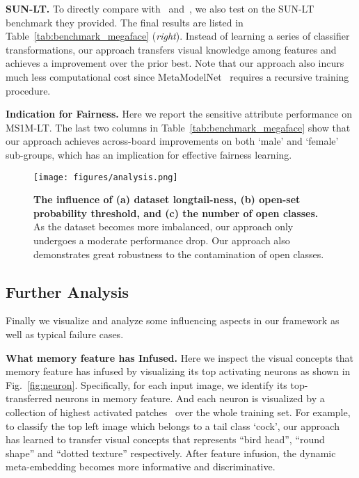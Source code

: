 \documentclass[10pt,twocolumn,letterpaper]{article}
\begin{document}
\vspace{2pt}
\noindent
\textbf{SUN-LT.}
To directly compare with~\cite{wang2016learning} and~\cite{wang2017learning}, we also test on the SUN-LT benchmark they provided.
The final results are listed in Table~\ref{tab:benchmark_megaface} (\emph{right}).
Instead of learning a series of classifier transformations, our approach transfers visual knowledge among features and achieves a  improvement over the prior best.
Note that our approach also incurs much less computational cost since MetaModelNet~\cite{wang2017learning} requires a recursive training procedure.


\vspace{2pt}
\noindent
\textbf{Indication for Fairness.}
Here we report the sensitive attribute performance on MS1M-LT.
The last two columns in Table~\ref{tab:benchmark_megaface} show that our approach achieves across-board improvements on both `male' and `female' sub-groups, which has an implication for effective fairness learning.



\begin{figure}
  \centering
  \texttt{[image: figures/analysis.png]}
  \caption{\textbf{The influence of (a) dataset longtail-ness, (b) open-set probability threshold, and (c) the number of open classes.} As the dataset becomes more imbalanced, our approach only undergoes a moderate performance drop. Our approach also demonstrates great robustness to the contamination of open classes.}
  \label{fig:analysis}
\end{figure}



\subsection{Further Analysis}
\label{sec:analysis}

Finally we visualize and analyze some influencing aspects in our framework as well as typical failure cases.

\vspace{2pt}
\noindent
\textbf{What memory feature has Infused.}
Here we inspect the visual concepts that memory feature has infused by visualizing its top activating neurons as shown in Fig.~\ref{fig:neuron}.
Specifically, for each input image, we identify its top- transferred neurons in memory feature.
And each neuron is visualized by a collection of highest activated patches~\cite{zeiler2014visualizing} over the whole training set. 
For example, to classify the top left image which belongs to a tail class `cock', our approach has learned to transfer visual concepts that represents ``bird head'', ``round shape'' and ``dotted texture'' respectively. 
After feature infusion, the dynamic meta-embedding becomes more informative and discriminative.
\end{document}
